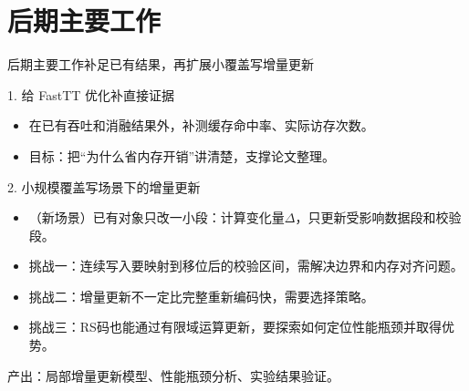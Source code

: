 
\section{后期主要工作}

\begin{frame}[t]{后期主要工作}{补足已有结果，再扩展小覆盖写增量更新}

    \vspace{-0.4em}
    \begin{block}{1. 给 FastTT 优化补直接证据}
        \footnotesize
        \begin{itemize}
            \setlength{\itemsep}{2pt}
            \item 在已有吞吐和消融结果外，补测缓存命中率、实际访存次数。
            \item 目标：把“为什么省内存开销”讲清楚，支撑论文整理。
        \end{itemize}
    \end{block}

    \vspace{0.35em}

    \begin{block}{2. 小规模覆盖写场景下的增量更新}
        \footnotesize
        \begin{itemize}
            \setlength{\itemsep}{3pt}
            \item （新场景）已有对象只改一小段：计算变化量$\Delta$，只更新受影响数据段和校验段。
            \item 挑战一：连续写入要映射到移位后的校验区间，需解决边界和内存对齐问题。
            \item 挑战二：增量更新不一定比完整重新编码快，需要选择策略。
            \item 挑战三：RS码也能通过有限域运算更新，要探索如何定位性能瓶颈并取得优势。
        \end{itemize}

        \vspace{0.2em}
        \centering
        \scriptsize 产出：局部增量更新模型、性能瓶颈分析、实验结果验证。
    \end{block}

\end{frame}
